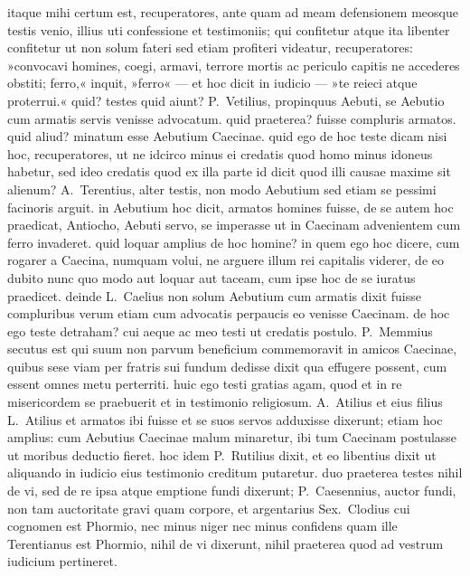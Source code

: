  itaque mihi certum est, recuperatores, ante quam ad meam defensionem meosque testis venio, illius uti confessione et testimoniis; qui confitetur atque ita libenter confitetur ut non solum fateri sed etiam profiteri videatur, recuperatores: »convocavi homines, coegi, armavi, terrore mortis ac periculo capitis ne accederes obstiti; ferro,« inquit, »ferro« — et hoc dicit in iudicio — »te reieci atque proterrui.« quid? testes quid aiunt? P.~Vetilius, propinquus Aebuti, se Aebutio cum armatis servis venisse advocatum. quid praeterea? fuisse compluris armatos. quid aliud? minatum esse Aebutium Caecinae. quid ego de hoc teste dicam nisi hoc, recuperatores, ut ne idcirco minus ei credatis quod homo minus idoneus habetur, sed ideo credatis quod ex illa parte id dicit quod illi causae maxime sit alienum?  A.~Terentius, alter testis, non modo Aebutium sed etiam se pessimi facinoris arguit. in Aebutium hoc dicit, armatos homines fuisse, de se autem hoc praedicat, Antiocho, Aebuti servo, se imperasse ut in Caecinam advenientem cum ferro invaderet. quid loquar amplius de hoc homine? in quem ego hoc dicere, cum rogarer a Caecina, numquam volui, ne arguere illum rei capitalis viderer, de eo dubito nunc quo modo aut loquar aut taceam, cum ipse hoc de se iuratus praedicet.  deinde L.~Caelius non solum Aebutium cum armatis dixit fuisse compluribus verum etiam cum advocatis perpaucis eo venisse Caecinam. de hoc ego teste detraham? cui aeque ac meo testi ut credatis postulo. P.~Memmius secutus est qui suum non parvum beneficium commemoravit in amicos Caecinae, quibus sese viam per fratris sui fundum dedisse dixit qua effugere possent, cum essent omnes metu perterriti. huic ego testi gratias agam, quod et in re misericordem se praebuerit et in testimonio religiosum.  A.~Atilius et eius filius L.~Atilius et armatos ibi fuisse et se suos servos adduxisse dixerunt; etiam hoc amplius: cum Aebutius Caecinae malum minaretur, ibi tum Caecinam postulasse ut moribus deductio fieret. hoc idem P.~Rutilius dixit, et eo libentius dixit ut aliquando in iudicio eius testimonio creditum putaretur. duo praeterea testes nihil de vi, sed de re ipsa atque emptione fundi dixerunt; P.~Caesennius, auctor fundi, non tam auctoritate gravi quam corpore, et argentarius Sex.~Clodius cui cognomen est Phormio, nec minus niger nec minus confidens quam ille Terentianus est Phormio, nihil de vi dixerunt, nihil praeterea quod ad vestrum iudicium pertineret.

